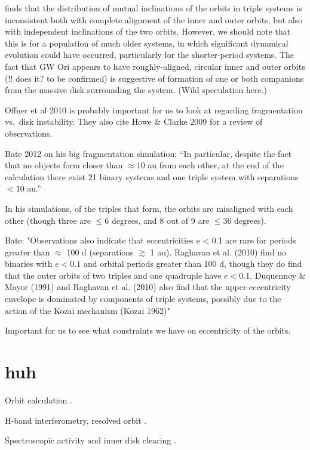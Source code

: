 \documentclass{aastex6}
\begin{document}
\citet{tokovinin97} finds that the distribution of mutual inclinations of the orbits in triple systems is inconsistent both with complete alignment of the inner and outer orbits, but also with independent inclinations of the two orbits.  However, we should note that this is for a population of much older systems, in which significant dynamical evolution could have occurred, particularly for the shorter-period systems.  The fact that GW Ori appears to have roughly-aligned, circular inner and outer orbits (!! does it?  to be confirmed) is suggestive of formation of one or both companions from the massive disk surrounding the system.  (Wild speculation here.) 

Offner et al 2010 is probably important for us to look at regarding fragmentation vs.\ disk instability.  They also cite Howe \& Clarke 2009 for a review of observations. 

Bate 2012 on his big fragmentation simulation: ``In particular, despite the fact that no objects form closer than $\approx 10$ au from each other, at the end of the calculation there exist 21 binary systems and one triple system with separations $<10$ au.''

In his simulations, of the triples that form, the orbits are misaligned with each other (though three are $\leq 6$ degrees, and 8 out of 9 are $\leq 36$ degrees). 

Bate:  "Observations also indicate that eccentricities e < 0.1 are rare for periods greater than $\approx$ 100 d (separations $\gtrsim$ 1 au). Raghavan et al. (2010) find no binaries with $e < 0.1$ and orbital periods greater than 100 d, though they do find that the outer orbits of two triples and one quadruple have $e < 0.1$. Duquennoy \& Mayor (1991) and Raghavan et al. (2010) also find that the upper-eccentricity envelope is dominated by components of triple systems, possibly due to the action of the Kozai mechanism (Kozai 1962)"

Important for us to see what constraints we have on eccentricity of the orbits. 


\section{huh}


Orbit calculation \citep{mathieu91}.

H-band interferometry, resolved orbit \citep{berger11}.

Spectroscopic activity and inner disk clearing \citep{fang14}.
\end{document}
